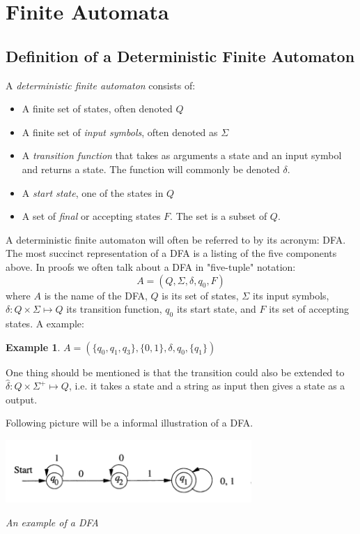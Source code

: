 \documentclass[12pt,reqno]{amsart}
\newtheorem{example}[thm]{Example}
\begin{document}
\section{Finite Automata}
\subsection{Definition of a Deterministic Finite Automaton}
A \textit{deterministic finite automaton} consists of:
\begin{itemize}
	\item A finite set of states, often denoted $Q$
	\item A finite set of \textit{input symbols}, often denoted as $\Sigma$
	\item A \textit{transition function} that takes as arguments a state and an input symbol and returns a state. The function will commonly be denoted $\delta$. 
	\item A \textit{start state}, one of the states in $Q$
	\item A set of \textit{final} or accepting states $F$. The set is a subset of $Q$.
\end{itemize}	
A deterministic finite automaton will often be referred to by its acronym: DFA. The most succinct representation of a DFA is a listing of the five components above. In proofs we often talk about a DFA in "five-tuple" notation:
$$
	A = (Q, \Sigma, \delta, q_0, F)
$$
where $A$ is the name of the DFA, $Q$ is its set of states, $\Sigma$ its input symbols, $\delta: Q\times\Sigma \mapsto Q$ its transition function, $q_0$ its start state, and $F$ its set of accepting states.
A example:
\begin{example}
	$A = (\{q_0, q_1, q_3\}, \{0,1\}, \delta, q_0, \{q_1\})$
\end{example}
One thing should be mentioned is that the transition could also be extended to $\hat{\delta}:Q\times\Sigma^+\mapsto Q$, i.e. it takes a state and a string as input then gives a state as a output.

Following picture will be a informal illustration of a DFA.

\begin{center}
	\includegraphics[width=0.7\textwidth]{example1}
	
	\textit{An example of a DFA}
\end{center}
\end{document}

